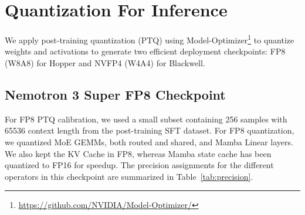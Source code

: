\section{Quantization For Inference}
\label{sec:quantization}

We apply post-training quantization (PTQ) using Model-Optimizer\footnote{\url{https://github.com/NVIDIA/Model-Optimizer/}} to quantize weights and activations to generate two efficient deployment checkpoints: FP8 (W8A8) for Hopper and NVFP4 (W4A4) for Blackwell. 

\subsection{Nemotron 3 Super FP8 Checkpoint}
For FP8 PTQ calibration, we used a small subset containing 256 samples with 65536 context length from the post-training SFT dataset. For FP8 quantization, we quantized MoE GEMMs, both routed and shared, and Mamba Linear layers. We also kept the KV Cache in FP8, whereas Mamba state cache has been quantized to FP16 for speedup. The precision assignments for the different operators in this checkpoint are summarized in Table~\ref{tab:precision}.

